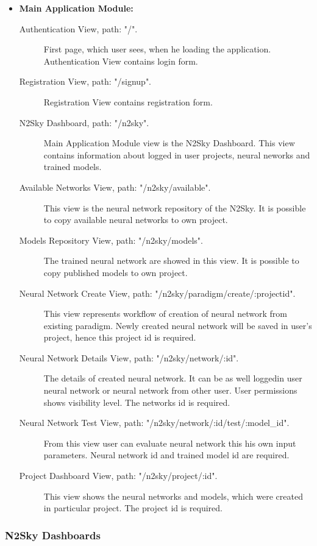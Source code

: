 \begin{itemize}
\item \textbf{Main Application Module:}
\begin{description}
\item[Authentication View, path: "/".] First page, which user sees, when he loading the application.  Authentication View contains login form.
\item[Registration View, path: "/signup".] Registration View contains registration form.
 \item[N2Sky Dashboard, path: "/n2sky".] Main Application Module view is the N2Sky Dashboard. This view contains information about logged in user projects, neural neworks and trained models.  
\item[Available Networks View, path: "/n2sky/available".] This view is the neural network repository of the N2Sky. It is possible to copy available neural networks to own project.
\item[Models Repository View, path: "/n2sky/models".] The trained neural network are showed in this view. It is possible to copy published models to own project.
\item[Neural Network Create View, path: "/n2sky/paradigm/create/:projectid".] This view represents workflow of creation of neural network from existing paradigm. Newly created neural network will be saved in user's project, hence this project id is required.  
\item[Neural Network Details View, path: "/n2sky/network/:id".] The details of created neural network. It can be as well loggedin user neural network or neural network from other user. User permissions shows visibility level. The networks id is required. 
\item[Neural Network Test View, path: "/n2sky/network/:id/test/:model\_id".] From this view user can evaluate neural network this his own input parameters. Neural network id and trained model id are required. 
\item[Project Dashboard View, path: "/n2sky/project/:id".] This view shows the neural networks and models, which were created in particular project. The project id is required.
\end{description}


\end{itemize}






\subsubsection{N2Sky Dashboards}\label{N2Sky Dashboards}

